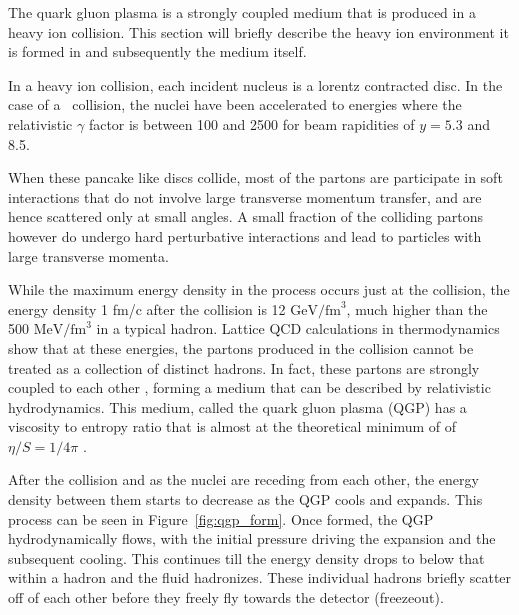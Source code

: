 
The quark gluon plasma is a strongly coupled medium \cite{} that is produced in a heavy ion collision. This section will briefly describe the heavy ion environment it is formed in and subsequently the medium itself. 

In a heavy ion collision, each incident nucleus is a lorentz contracted disc. In the case of a \pbpb\ collision, the nuclei have been accelerated to energies where the relativistic $\gamma$ factor is between 100 and 2500 for beam rapidities of $y = 5.3$ and 8.5. 

When these pancake like discs collide, most of the partons are participate in soft interactions that do not involve large transverse momentum transfer, and are hence scattered only at small angles. A small fraction of the colliding partons however do undergo hard perturbative interactions and lead to particles with large transverse momenta.

While the maximum energy density in the process occurs just at the collision, the energy density 1 fm/c after the collision is 12 $\mathrm{GeV} / \mathrm{fm}^3$, much higher than the 500 $\mathrm{MeV} / \mathrm{fm}^3$ in a typical hadron. Lattice QCD calculations in thermodynamics show that at these energies, the partons produced in the collision cannot be treated as a collection of distinct hadrons. In fact, these partons are strongly coupled to each other \cite{} , forming a medium that can be described by relativistic hydrodynamics. This medium, called the quark gluon plasma (QGP) has a viscosity to entropy ratio that is almost at the theoretical minimum of of $\eta / S = 1/4\pi$ \cite{}. 

After the collision and as the nuclei are receding from each other, the energy density between them starts to decrease as the QGP cools and expands. This process can be seen in Figure~\ref{fig:qgp_form}. Once formed, the QGP hydrodynamically flows, with the initial pressure driving the expansion and the subsequent cooling. This continues till the energy density drops to below that within a hadron and the fluid hadronizes. These individual hadrons briefly scatter off of each other before they freely fly towards the detector (freezeout).

